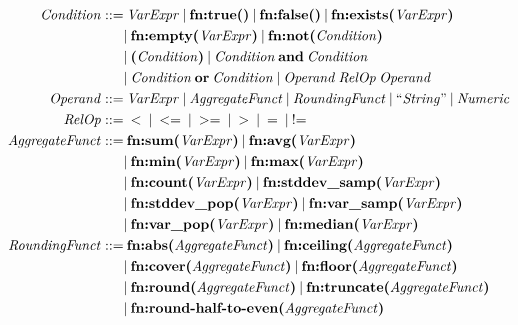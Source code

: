 \begin{figure}[ht]
\begin{align*}
    \mtext{Condition} ::= & \mspaceb \mtext{VarExpr} \mspaceb | \mspaceb \text{\textbf{fn:true()}} \mspaceb | \mspaceb \text{\textbf{fn:false()}} \mspaceb | \mspaceb \text{\textbf{fn:exists(}\memph{VarExpr}\textbf{)}} \\
    \mspaceb & | \mspaceb \text{\textbf{fn:empty(}\memph{VarExpr}\textbf{)}} \mspaceb | \mspaceb \text{\textbf{fn:not}}\text{\textbf{(}\memph{Condition}\textbf{)}} \\ \mspaceb & | \mspaceb \text{\textbf{(}\memph{Condition}\textbf{)}} \mspaceb | \mspaceb \mtext{Condition} \mspaceb \text{\textbf{and}} \mspaceb \mtext{Condition} \\ \mspaceb & | \mspaceb \mtext{Condition} \mspaceb \text{\textbf{or}} \mspaceb \mtext{Condition} \mspaceb | \mspaceb \mtext{Operand} \mspaceb \mtext{RelOp} \mspaceb \mtext{Operand} \\
    \mtext{Operand} ::= & \mspaceb \mtext{VarExpr} \mspaceb | \mspaceb \mtext{AggregateFunct} \mspaceb | \mspaceb \mtext{RoundingFunct} \mspaceb | \mspaceb \text{``\memph{String}''} \mspaceb | \mspaceb \mtext{Numeric} \\
    \mtext{RelOp} ::= & \mspaceb < \mspaceb | \mspaceb <= \mspaceb | \mspaceb >= \mspaceb | \mspaceb > \mspaceb | \mspaceb = \mspaceb | \mspaceb \text{!=} \\
    \mtext{AggregateFunct} ::= & \mspaceb \text{\textbf{fn:sum(}\memph{VarExpr}\textbf{)}} \mspaceb | \mspaceb \text{\textbf{fn:avg(}\memph{VarExpr}\textbf{)}} \\ \mspaceb & | \mspaceb \text{\textbf{fn:min(}\memph{VarExpr}\textbf{)}} \mspaceb | \mspaceb \text{\textbf{fn:max(}\memph{VarExpr}\textbf{)}} \\ \mspaceb & | \mspaceb \text{\textbf{fn:count(}\memph{VarExpr}\textbf{)}} \mspaceb | \mspaceb \text{\textbf{fn:stddev\_samp(}\memph{VarExpr}\textbf{)}} \\ \mspaceb & | \mspaceb \text{\textbf{fn:stddev\_pop(}\memph{VarExpr}\textbf{)}} \mspaceb | \mspaceb \text{\textbf{fn:var\_samp(}\memph{VarExpr}\textbf{)}} \\ \mspaceb & | \mspaceb \text{\textbf{fn:var\_pop(}\memph{VarExpr}\textbf{)}} \mspaceb | \mspaceb \text{\textbf{fn:median(}\memph{VarExpr}\textbf{)}} \\
    \mtext{RoundingFunct} ::= & \mspaceb \text{\textbf{fn:abs(}\memph{AggregateFunct}\textbf{)}} \mspaceb | \mspaceb \text{\textbf{fn:ceiling(}\memph{AggregateFunct}\textbf{)}} \\ \mspaceb & | \mspaceb \text{\textbf{fn:cover(}\memph{AggregateFunct}\textbf{)}} \mspaceb | \mspaceb \text{\textbf{fn:floor(}\memph{AggregateFunct}\textbf{)}} \\ \mspaceb & | \mspaceb \text{\textbf{fn:round(}\memph{AggregateFunct}\textbf{)}} \mspaceb | \mspaceb \text{\textbf{fn:truncate(}\memph{AggregateFunct}\textbf{)}} \\ \mspaceb & | \mspaceb \text{\textbf{fn:round-half-to-even(}\memph{AggregateFunct}\textbf{)}} \\

\end{align*}
\end{figure}
